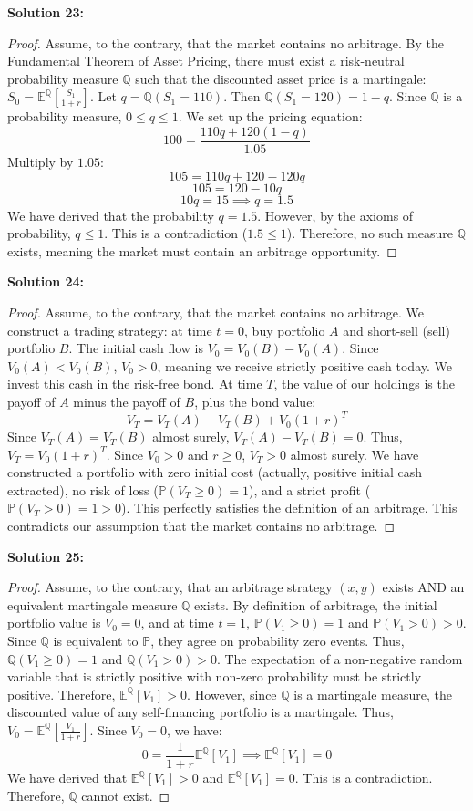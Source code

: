 \documentclass[11pt]{article}
\theoremstyle{definition}
\begin{document}
\textbf{Solution 23:}
\begin{proof}
Assume, to the contrary, that the market contains no arbitrage. By the Fundamental Theorem of Asset Pricing, there must exist a risk-neutral probability measure $\mathbb{Q}$ such that the discounted asset price is a martingale: $S_0 = \mathbb{E}^\mathbb{Q}\left[\frac{S_1}{1+r}\right]$. Let $q = \mathbb{Q}(S_1 = 110)$. Then $\mathbb{Q}(S_1 = 120) = 1 - q$. Since $\mathbb{Q}$ is a probability measure, $0 \le q \le 1$. We set up the pricing equation:
\[ 100 = \frac{110q + 120(1 - q)}{1.05} \]
Multiply by $1.05$:
\[ 105 = 110q + 120 - 120q \]
\[ 105 = 120 - 10q \]
\[ 10q = 15 \implies q = 1.5 \]
We have derived that the probability $q = 1.5$. However, by the axioms of probability, $q \le 1$. This is a contradiction ($1.5 \le 1$). Therefore, no such measure $\mathbb{Q}$ exists, meaning the market must contain an arbitrage opportunity.
\end{proof}

\textbf{Solution 24:}
\begin{proof}
Assume, to the contrary, that the market contains no arbitrage. We construct a trading strategy: at time $t=0$, buy portfolio $A$ and short-sell (sell) portfolio $B$. The initial cash flow is $V_0 = V_0(B) - V_0(A)$. Since $V_0(A) < V_0(B)$, $V_0 > 0$, meaning we receive strictly positive cash today. We invest this cash in the risk-free bond.
At time $T$, the value of our holdings is the payoff of $A$ minus the payoff of $B$, plus the bond value:
\[ V_T = V_T(A) - V_T(B) + V_0(1+r)^T \]
Since $V_T(A) = V_T(B)$ almost surely, $V_T(A) - V_T(B) = 0$. Thus, $V_T = V_0(1+r)^T$. Since $V_0 > 0$ and $r \ge 0$, $V_T > 0$ almost surely. 
We have constructed a portfolio with zero initial cost (actually, positive initial cash extracted), no risk of loss ($\mathbb{P}(V_T \ge 0) = 1$), and a strict profit ($\mathbb{P}(V_T > 0) = 1 > 0$). This perfectly satisfies the definition of an arbitrage. This contradicts our assumption that the market contains no arbitrage.
\end{proof}

\textbf{Solution 25:}
\begin{proof}
Assume, to the contrary, that an arbitrage strategy $(x, y)$ exists AND an equivalent martingale measure $\mathbb{Q}$ exists. By definition of arbitrage, the initial portfolio value is $V_0 = 0$, and at time $t=1$, $\mathbb{P}(V_1 \ge 0) = 1$ and $\mathbb{P}(V_1 > 0) > 0$. 
Since $\mathbb{Q}$ is equivalent to $\mathbb{P}$, they agree on probability zero events. Thus, $\mathbb{Q}(V_1 \ge 0) = 1$ and $\mathbb{Q}(V_1 > 0) > 0$. 
The expectation of a non-negative random variable that is strictly positive with non-zero probability must be strictly positive. Therefore, $\mathbb{E}^\mathbb{Q}[V_1] > 0$.
However, since $\mathbb{Q}$ is a martingale measure, the discounted value of any self-financing portfolio is a martingale. Thus, $V_0 = \mathbb{E}^\mathbb{Q}\left[\frac{V_1}{1+r}\right]$. Since $V_0 = 0$, we have:
\[ 0 = \frac{1}{1+r} \mathbb{E}^\mathbb{Q}[V_1] \implies \mathbb{E}^\mathbb{Q}[V_1] = 0 \]
We have derived that $\mathbb{E}^\mathbb{Q}[V_1] > 0$ and $\mathbb{E}^\mathbb{Q}[V_1] = 0$. This is a contradiction. Therefore, $\mathbb{Q}$ cannot exist.
\end{proof}
\end{document}
